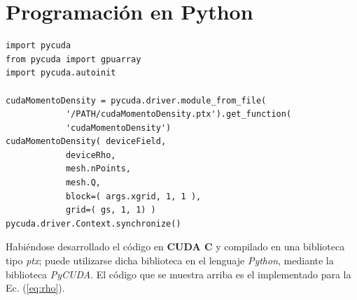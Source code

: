 \section{Programación en Python}
{\footnotesize
	\begin{frame}{}
		\begin{lstlisting}[frame=single]
import pycuda
from pycuda import gpuarray
import pycuda.autoinit
		
cudaMomentoDensity = pycuda.driver.module_from_file(
			'/PATH/cudaMomentoDensity.ptx').get_function(
			'cudaMomentoDensity')					
cudaMomentoDensity(	deviceField,
			deviceRho,
			mesh.nPoints,
			mesh.Q,
			block=( args.xgrid, 1, 1 ),
			grid=( gs, 1, 1) )     			    
pycuda.driver.Context.synchronize()
		\end{lstlisting}
		
	\end{frame}
}

Habiéndose desarrollado el código en \textbf{CUDA C} y compilado en una biblioteca tipo \textit{ptx}; puede utilizarse dicha biblioteca en el lenguaje \textit{Python}, mediante la biblioteca \textit{PyCUDA}. El código que se muestra arriba es el implementado para la Ec. (\ref{eq:rho}).

